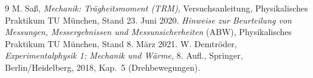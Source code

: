\documentclass[11pt,a4paper]{article}
\begin{document}
\begin{thebibliography}{9}
M. Saß, \emph{Mechanik: Trägheitsmoment (TRM)}, Versuchsanleitung,
Physikalisches Praktikum TU München, Stand 23. Juni 2020.
\emph{Hinweise zur Beurteilung von Messungen, Messergebnissen und Messunsicherheiten} (ABW),
Physikalisches Praktikum TU München, Stand 8. März 2021.
W. Demtröder, \emph{Experimentalphysik 1: Mechanik und Wärme},
8. Aufl., Springer, Berlin/Heidelberg, 2018, Kap.~5 (Drehbewegungen).
\end{thebibliography}
\end{document}
